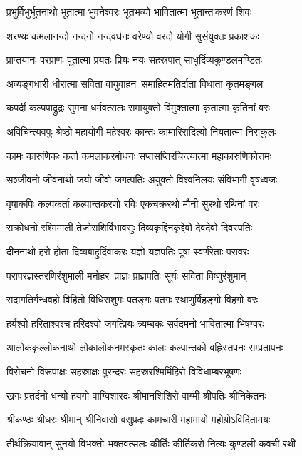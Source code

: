 \twolineshloka
{प्रभुर्विभुर्भूतनाथो भूतात्मा भुवनेश्वरः}
{भूतभव्यो भावितात्मा भूतान्तःकरणं शिवः}%

\twolineshloka
{शरण्यः कमलानन्दो नन्दनो नन्दवर्धनः}
{वरेण्यो वरदो योगी सुसंयुक्तः प्रकाशकः} %

\twolineshloka
{प्राप्तयानः परप्राणः पूतात्मा प्रयतः प्रियः}
{नयः सहस्रपात् साधुर्दिव्यकुण्डलमण्डितः}%

\twolineshloka
{अव्यङ्गधारी धीरात्मा सविता वायुवाहनः}
{समाहितमतिर्दाता विधाता कृतमङ्गलः}%

\twolineshloka
{कपर्दी कल्पपाद्रुद्रः सुमना धर्मवत्सलः}
{समायुक्तो विमुक्तात्मा कृतात्मा कृतिनां वरः}%

\twolineshloka
{अविचिन्त्यवपुः श्रेष्ठो महायोगी महेश्वरः}
{कान्तः कामारिरादित्यो नियतात्मा निराकुलः}%

\twolineshloka
{कामः कारुणिकः कर्ता कमलाकरबोधनः}
{सप्तसप्तिरचिन्त्यात्मा महाकारुणिकोत्तमः}%

\twolineshloka
{सञ्जीवनो जीवनाथो जयो जीवो जगत्पतिः}
{अयुक्तो विश्वनिलयः संविभागी वृषध्वजः}%

\twolineshloka
{वृषाकपिः कल्पकर्ता कल्पान्तकरणो रविः}
{एकचक्ररथो मौनी सुरथो रथिनां वरः}%

\twolineshloka
{सक्रोधनो रश्मिमाली तेजोराशिर्विभावसुः}
{दिव्यकृद्दिनकृद्देवो देवदेवो दिवस्पतिः}%

\twolineshloka
{दीननाथो हरो  होता दिव्यबाहुर्दिवाकरः}
{यज्ञो यज्ञपतिः पूषा स्वर्णरेताः परावरः}%

\twolineshloka
{परापरज्ञस्तरणिरंशुमाली मनोहरः}
{प्राज्ञः प्राज्ञपतिः सूर्यः सविता विष्णुरंशुमान्}%

\twolineshloka
{सदागतिर्गन्धवहो विहितो विधिराशुगः}
{पतङ्गः पतगः स्थाणुर्विहङ्गो विहगो वरः}%

\twolineshloka
{हर्यश्वो हरिताश्वश्च हरिदश्वो जगत्प्रियः}
{त्र्यम्बकः सर्वदमनो भावितात्मा भिषग्वरः}%

\twolineshloka
{आलोककृल्लोकनाथो लोकालोकनमस्कृतः}
{कालः कल्पान्तको वह्निस्तपनः सम्प्रतापनः}%

\twolineshloka
{विरोचनो विरूपाक्षः सहस्राक्षः पुरन्दरः}
{सहस्ररश्मिर्मिहिरो विविधाम्बरभूषणः}%

\twolineshloka
{खगः प्रतर्दनो धन्यो हयगो वाग्विशारदः}
{श्रीमानशिशिरो वाग्मी श्रीपतिः श्रीनिकेतनः}%

\twolineshloka
{श्रीकण्ठः श्रीधरः श्रीमान्  श्रीनिवासो वसुप्रदः}
{कामचारी महामायो महोग्रोऽविदितामयः}%

\twolineshloka
{तीर्थक्रियावान् सुनयो विभक्तो भक्तवत्सलः}
{कीर्तिः कीर्तिकरो नित्यः कुण्डली कवची रथी}%

